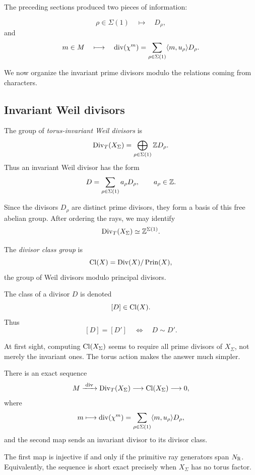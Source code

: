 The preceding sections produced two pieces of information:

\[
\rho\in\Sigma(1)
\quad\longmapsto\quad
D_\rho,
\]
and
\[
m\in M
\quad\longmapsto\quad
\operatorname{div}(\chi^{m})
=
\sum_{\rho\in\Sigma(1)}
\langle m,u_\rho\rangle D_\rho.
\]

We now organize the invariant prime divisors modulo the relations
coming from characters.

\subsection{Invariant Weil divisors}

\begin{definition}
The group of \emph{torus-invariant Weil divisors} is
\[
\operatorname{Div}_T(X_\Sigma)
=
\bigoplus_{\rho\in\Sigma(1)}\mathbb{Z} D_\rho.
\]
Thus an invariant Weil divisor has the form
\[
D=\sum_{\rho\in\Sigma(1)}a_\rho D_\rho,
\qquad
a_\rho\in\mathbb{Z}.
\]
\end{definition}

Since the divisors \(D_\rho\) are distinct prime divisors, they form a
basis of this free abelian group. After ordering the rays, we may
identify
\[
\operatorname{Div}_T(X_\Sigma)
\simeq
\mathbb{Z}^{\Sigma(1)}.
\]

\begin{definition}
The \emph{divisor class group} is
\[
\operatorname{Cl}(X)
=
\operatorname{Div}(X)/
\operatorname{Prin}(X),
\]
the group of Weil divisors modulo principal divisors.

The class of a divisor \(D\) is denoted
\[
[D]\in\operatorname{Cl}(X).
\]
Thus
\[
[D]=[D']
\quad\Longleftrightarrow\quad
D\sim D'.
\]
\end{definition}

At first sight, computing \(\operatorname{Cl}(X_\Sigma)\) seems to
require all prime divisors of \(X_\Sigma\), not merely the invariant
ones. The torus action makes the answer much simpler.

\begin{theorem}
\label{thm:toric-class-group-sequence}
There is an exact sequence
\[
M
\xrightarrow{\;\operatorname{div}\;}
\operatorname{Div}_T(X_\Sigma)
\longrightarrow
\operatorname{Cl}(X_\Sigma)
\longrightarrow
0,
\]
where
\[
m\longmapsto
\operatorname{div}(\chi^{m})
=
\sum_{\rho\in\Sigma(1)}
\langle m,u_\rho\rangle D_\rho,
\]
and the second map sends an invariant divisor to its divisor class.

The first map is injective if and only if the primitive ray
generators span \(N_{\mathbb{R}}\). Equivalently, the sequence is short exact
precisely when \(X_\Sigma\) has no torus factor.
\end{theorem}

